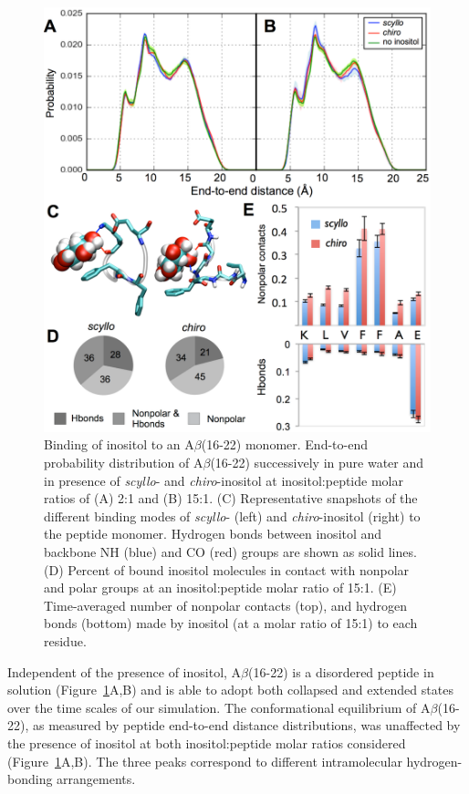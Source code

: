 \begin{figure}
\centering
\includegraphics[width=14.6cm]{figures/results2/inos2_figures_monomers_revised.pdf}
\caption[Binding of inositol to an A$\beta$(16-22) monomer]{Binding of inositol to an A$\beta$(16-22) monomer.  End-to-end probability distribution of A$\beta$(16-22) successively in pure water and in presence of \emph{scyllo}- and \emph{chiro}-inositol at inositol:peptide molar ratios of (A) 2:1 and (B) 15:1.  (C) Representative snapshots of the different binding modes of \emph{scyllo}- (left) and \emph{chiro}-inositol (right)  to the peptide monomer. Hydrogen bonds between inositol and backbone NH (blue) and CO (red) groups are shown as solid lines. (D) Percent of bound inositol molecules in contact with nonpolar and polar groups at an inositol:peptide molar ratio of 15:1. (E) Time-averaged number of nonpolar contacts (top), and hydrogen bonds (bottom) made by inositol  (at a molar ratio of 15:1) to each residue.}
\label{fig:monomers}
\end{figure}

Independent of the presence of inositol, A$\beta$(16-22) is a disordered peptide in solution (Figure~\ref{fig:monomers}A,B) and is able to adopt both collapsed and extended states over the time scales of our simulation. The conformational equilibrium of A$\beta$(16-22), as measured by peptide end-to-end distance distributions, was unaffected by the presence of inositol at both inositol:peptide molar ratios considered (Figure~\ref{fig:monomers}A,B). The three peaks correspond to different intramolecular hydrogen-bonding arrangements.

